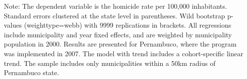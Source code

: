 \begin{table}[h!]
\begin{tablenotes}
\small
\item Note: The dependent variable is the homicide rate per 100,000 inhabitants. 
Standard errors clustered at the state level in parentheses. 
Wild bootstrap p-values (weighttype=webb) with 9999 replications in brackets. 
All regressions include municipality and year fixed effects, and are weighted by municipality population in 2000. 
Results are presented for Pernambuco, where the program was implemented in 2007. 
The model with trend includes a cohort-specific linear trend. 
The sample includes only municipalities within a 50km radius of Pernambuco state. 
\end{tablenotes}
\end{table}
